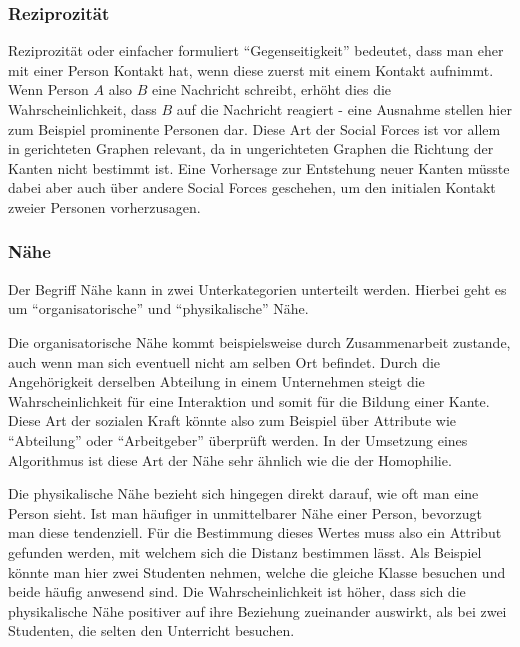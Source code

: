 \subsubsection{Reziprozität}
Reziprozität oder einfacher formuliert ``Gegenseitigkeit'' bedeutet, dass man eher mit einer Person Kontakt hat, wenn
diese zuerst mit einem Kontakt aufnimmt. Wenn Person $A$ also $B$ eine Nachricht schreibt, erhöht dies die Wahrscheinlichkeit, dass $B$ auf
die Nachricht reagiert - eine Ausnahme stellen hier zum Beispiel prominente Personen dar.
Diese Art der Social Forces ist vor allem in gerichteten Graphen relevant, da in ungerichteten Graphen die
Richtung der Kanten nicht bestimmt ist. Eine Vorhersage zur Entstehung neuer Kanten müsste dabei aber auch über
andere Social Forces geschehen, um den initialen Kontakt zweier Personen vorherzusagen.

\subsubsection{Nähe}
Der Begriff Nähe kann in zwei Unterkategorien unterteilt werden. Hierbei geht es um ``organisatorische'' und
``physikalische'' Nähe.

Die organisatorische Nähe kommt beispielsweise durch Zusammenarbeit zustande, auch wenn man sich eventuell nicht
am selben Ort befindet. Durch die Angehörigkeit derselben Abteilung in einem Unternehmen steigt die Wahrscheinlichkeit
für eine Interaktion und somit für die Bildung einer Kante. Diese Art der sozialen Kraft könnte also zum Beispiel
über Attribute wie ``Abteilung'' oder ``Arbeitgeber'' überprüft werden. In der Umsetzung eines Algorithmus ist diese Art der
Nähe sehr ähnlich wie die der Homophilie.

Die physikalische Nähe bezieht sich hingegen direkt darauf, wie oft man eine Person sieht. Ist man häufiger in
unmittelbarer Nähe einer Person, bevorzugt man diese tendenziell. Für die Bestimmung dieses Wertes muss also ein Attribut
gefunden werden, mit welchem sich die Distanz bestimmen lässt. Als Beispiel könnte man hier zwei Studenten nehmen,
welche die gleiche Klasse besuchen und beide häufig anwesend sind. Die Wahrscheinlichkeit ist höher, dass sich die
physikalische Nähe positiver auf ihre Beziehung zueinander auswirkt, als bei zwei Studenten, die selten den Unterricht besuchen.

